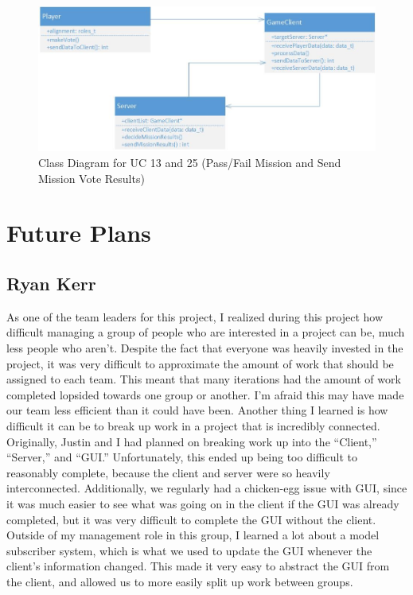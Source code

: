 \documentclass{hitec}
\begin{document}
\begin{center}
\begin{figure}[h]
\includegraphics[scale=0.5]{Report03}
\caption{Class Diagram for UC 13 and 25 (Pass/Fail Mission and Send Mission Vote Results)}
\end{figure}
\end{center}

\pagebreak

\section{Future Plans}
\subsection{Ryan Kerr}
As one of the team leaders for this project, I realized during this project how difficult managing a group of people who are interested in a project can be, much less people who aren’t. Despite the fact that everyone was heavily invested in the project, it was very difficult to approximate the amount of work that should be assigned to each team. This meant that many iterations had the amount of work completed lopsided towards one group or another. I’m afraid this may have made our team less efficient than it could have been. Another thing I learned is how difficult it can be to break up work in a project that is incredibly connected.  Originally, Justin and I had planned on breaking work up into the “Client,” “Server,” and “GUI.” Unfortunately, this ended up being too difficult to reasonably complete, because the client and server were so heavily interconnected. Additionally, we regularly had a chicken-egg issue with GUI, since it was much easier to see what was going on in the client if the GUI was already completed, but it was very difficult to complete the GUI without the client. Outside of my management role in this group, I learned a lot about a model subscriber system, which is what we used to update the GUI whenever the client’s information changed. This made it very easy to abstract the GUI from the client, and allowed us to more easily split up work between groups. 
\end{document}
